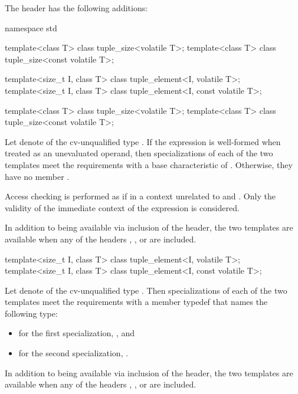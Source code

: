 The header  has the following additions:

\begin{codeblock}
namespace std {
  template<class T> class tuple_size<volatile T>;
  template<class T> class tuple_size<const volatile T>;

  template<size_t I, class T> class tuple_element<I, volatile T>;
  template<size_t I, class T> class tuple_element<I, const volatile T>;
}
\end{codeblock}

\begin{itemdecl}
template<class T> class tuple_size<volatile T>;
template<class T> class tuple_size<const volatile T>;
\end{itemdecl}

\begin{itemdescr}
\pnum
Let  denote  of the cv-unqualified type .
If the expression  is well-formed
when treated as an unevaluated operand,
then specializations of each of the two templates meet
the  requirements with a base characteristic of
.
Otherwise, they have no member .

\pnum
Access checking is performed as if
in a context unrelated to  and .
Only the validity of the immediate context of the expression is considered.

\pnum
In addition to being available via inclusion of the  header,
the two templates are available when any of the headers
,
, or
are included.
\end{itemdescr}

\begin{itemdecl}
template<size_t I, class T> class tuple_element<I, volatile T>;
template<size_t I, class T> class tuple_element<I, const volatile T>;
\end{itemdecl}

\begin{itemdescr}
\pnum
Let  denote 
of the cv-unqualified type .
Then specializations of each of the two templates meet
the  requirements
with a member typedef  that names the following type:
\begin{itemize}
\item for the first specialization, , and
\item for the second specialization, .
\end{itemize}

\pnum
In addition to being available via inclusion of the  header,
the two templates are available when any of the headers
,
, or
are included.
\end{itemdescr}

